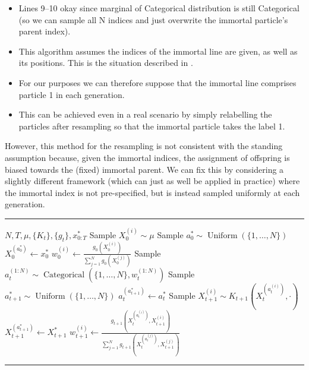\documentclass[fleqn]{article}
\newcommand{\Cat}{\operatorname{Categorical}}
\newcommand{\Unif}{\operatorname{Uniform}}
\begin{document}
\begin{itemize}
\item Lines 9--10 okay since marginal of Categorical distribution is still Categorical (so we can sample all N indices and just overwrite the immortal particle's parent index).
\item This algorithm assumes the indices of the immortal line are given, as well as its positions. This is the situation described in \citet{andrieu2010}.
\item For our purposes we can therefore suppose that the immortal line comprises particle 1 in each generation.
\item This can be achieved even in a real scenario by simply relabelling the particles after resampling so that the immortal particle takes the label 1.
\end{itemize}

However, this method for the resampling is not consistent with the standing assumption because, given the immortal indices, the assignment of offspring is biased towards the (fixed) immortal parent.
We can fix this by considering a slightly different framework (which can just as well be applied in practice) where the immortal index is not pre-specified, but is instead sampled uniformly at each generation.\\

\hrule
\begin{algorithmic}[1]
\Require $N, T, \mu, \{K_t\}, \{g_t\}, x_{0:T}^*$
	\State Sample $X_0^{(i)} \sim \mu$ 
\EndFor
\State Sample $a_0^* \sim \Unif(\{1,\dots,N\})$
\State $X_0^{(a_0^*)} \gets x_0^*$
	\State $w_0^{(i)} \gets \frac{g_0(X_0^{(i)})}{\sum_{j=1}^N g_0(X_0^{(j)})}$
\EndFor
{}
	\State Sample $a_t^{(1:N)} \sim \Cat(\{1,\dots,N\}, w_t^{(1:N)})$
	\State Sample $a_{t+1}^* \sim \Unif(\{1,\dots,N\})$
	\State $a_t^{(a_{t+1}^*)} \gets a_t^*$
		\State Sample $X_{t+1}^{(i)} \sim K_{t+1}(X_t^{(a_t^{(i)})}, \cdot)$
	\EndFor
	\State $X_{t+1}^{(a_{t+1}^*)} \gets X_{t+1}^*$
		\State $w_{t+1}^{(i)} \gets \frac{g_{t+1}(X_t^{(a_t^{(i)})} , X_{t+1}^{(i)})}{\sum_{j=1}^N g_{t+1}(X_t^{(a_t^{(j)})} , X_{t+1}^{(j)})}$
	\EndFor
\EndFor
\end{algorithmic}
\hrule


\end{document}
